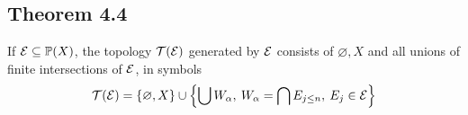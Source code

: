 \documentclass[../../main.tex]{subfiles}
\begin{document}
\subsection{Theorem 4.4}
\begin{wts}
    If $\mathcal{E}\subseteq\mathbb{P}(X)$, the topology $\mathcal{T}(\mathcal{E})$ generated by $\mathcal{E}$ consists of $\varnothing, X$ and all unions of finite intersections of $\mathcal{E}$, in symbols
    \[
    \mathcal{T}(\mathcal{E})=\{\varnothing, X\}\cup\left\{\bigcup W_\alpha,\:W_\alpha = \bigcap E_{j\leq n},\: E_j\in\mathcal{E}\right\}
    \]
\end{wts}
\end{document}

